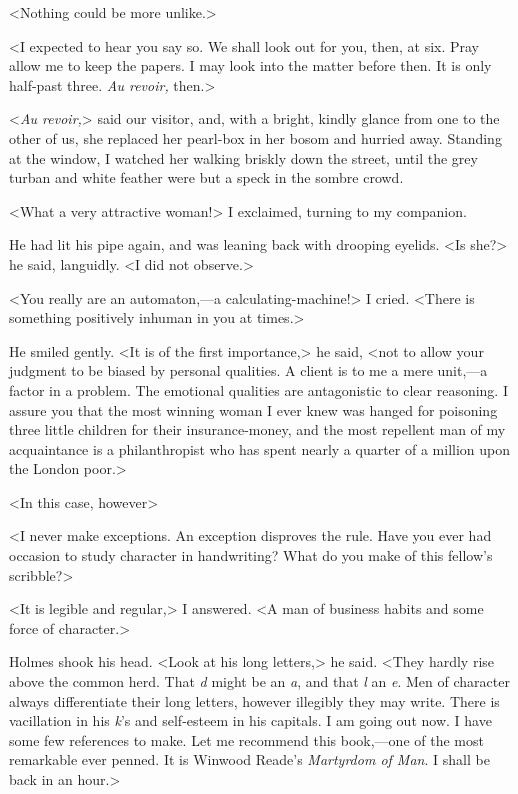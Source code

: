 <Nothing could be more unlike.>

<I expected to hear you say so. We shall look out for you, then, at six. Pray allow me to keep the papers. I may look into the matter before then. It is only half-past three. \textit{Au revoir,} then.>

<\textit{Au revoir,}> said our visitor, and, with a bright, kindly glance from one to the other of us, she replaced her pearl-box in her bosom and hurried away. Standing at the window, I watched her walking briskly down the street, until the grey turban and white feather were but a speck in the sombre crowd.

<What a very attractive woman!> I exclaimed, turning to my companion.

He had lit his pipe again, and was leaning back with drooping eyelids. <Is she?> he said, languidly. <I did not observe.>

<You really are an automaton,—a calculating-machine!> I cried. <There is something positively inhuman in you at times.>

He smiled gently. <It is of the first importance,> he said, <not to allow your judgment to be biased by personal qualities. A client is to me a mere unit,—a factor in a problem. The emotional qualities are antagonistic to clear reasoning. I assure you that the most winning woman I ever knew was hanged for poisoning three little children for their insurance-money, and the most repellent man of my acquaintance is a philanthropist who has spent nearly a quarter of a million upon the London poor.>

<In this case, however\longdash>

<I never make exceptions. An exception disproves the rule. Have you ever had occasion to study character in handwriting? What do you make of this fellow's scribble?>

<It is legible and regular,> I answered. <A man of business habits and some force of character.>

Holmes shook his head. <Look at his long letters,> he said. <They hardly rise above the common herd. That \textit{d} might be an \textit{a}, and that \textit{l} an \textit{e}. Men of character always differentiate their long letters, however illegibly they may write. There is vacillation in his \textit{k}'s and self-esteem in his capitals. I am going out now. I have some few references to make. Let me recommend this book,—one of the most remarkable ever penned. It is Winwood Reade's \textit{Martyrdom of Man}. I shall be back in an hour.>

